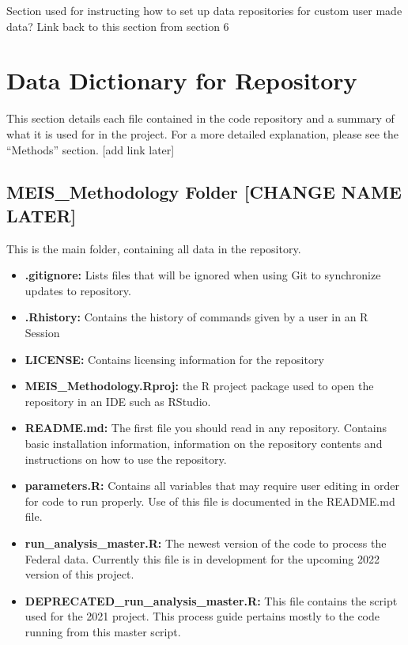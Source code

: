 \documentclass[
]{book}
\providecommand{\tightlist}{%
  \setlength{\itemsep}{0pt}\setlength{\parskip}{0pt}}
\begin{document}
Section used for instructing how to set up data repositories for custom user made data? Link back to this section from section 6

\hypertarget{data-dictionary-for-repository}{%
\chapter{Data Dictionary for Repository}\label{data-dictionary-for-repository}}

This section details each file contained in the code repository and a summary of what it is used for in the project. For a more detailed explanation, please see the ``Methods'' section. {[}add link later{]}

\hypertarget{meis_methodology-folder-change-name-later}{%
\section{MEIS\_Methodology Folder {[}CHANGE NAME LATER{]}}\label{meis_methodology-folder-change-name-later}}

This is the main folder, containing all data in the repository.

\begin{itemize}
\tightlist
\item
  \textbf{.gitignore:} Lists files that will be ignored when using Git to synchronize updates to repository.
\item
  \textbf{.Rhistory:} Contains the history of commands given by a user in an R Session
\item
  \textbf{LICENSE:} Contains licensing information for the repository
\item
  \textbf{MEIS\_Methodology.Rproj:} the R project package used to open the repository in an IDE such as RStudio.
\item
  \textbf{README.md:} The first file you should read in any repository. Contains basic installation information, information on the repository contents and instructions on how to use the repository.
\item
  \textbf{parameters.R:} Contains all variables that may require user editing in order for code to run properly. Use of this file is documented in the README.md file.
\item
  \textbf{run\_analysis\_master.R:} The newest version of the code to process the Federal data. Currently this file is in development for the upcoming 2022 version of this project.
\item
  \textbf{DEPRECATED\_run\_analysis\_master.R:} This file contains the script used for the 2021 project. This process guide pertains mostly to the code running from this master script.
\end{itemize}
\end{document}
